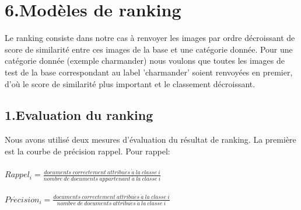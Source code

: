 \documentclass[a4paper,11pt]{report}
\begin{document}
\section*{6.Modèles de ranking}
Le ranking consiste dans notre cas à renvoyer les images par ordre décroissant de score de similarité entre ces images de la base et une catégorie donnée. Pour une catégorie donnée (exemple charmander) nous voulons que toutes les images de test de la base correspondant au label 'charmander' soient renvoyées en premier, d'où le score de similarité plus important et le classement décroissant. 
\subsection*{1.Evaluation du ranking}
Nous avons utilisé deux mesures d'évaluation du résultat de ranking. La première est la courbe de précision rappel. Pour rappel:\\\\
$Rappel_i = \frac{documents~correctement~attribu\acute{e}s~\grave{a}~la~classe~i}{nombre~de~documents~appartenant~\grave{a}~la~classe~i} $\\\\
$Pr\acute{e}cision_i = \frac{documents~correctement~attribu\acute{e}s~\grave{a}~la~classe~i}{nombre~de~documents~attribu\acute{e}s~\grave{a}~la~classe~i} $\\\\
\end{document}
